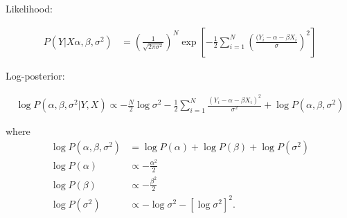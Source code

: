 Likelihood:

\begin{align*}
    P(Y|X\alpha, \beta, \sigma^2) & =
    \left(
        \frac{1}{\sqrt{2\pi\sigma^2}}
    \right)^N
    \exp
    \left[
        -\frac{1}{2}
        \sum_{i=1}^N
        \left(
            \frac{(Y_i - \alpha - \beta X_i}{\sigma}
        \right)^2
    \right]
\end{align*}

Log-posterior:

\begin{align*}
    \log P(\alpha, \beta, \sigma^2|Y, X) \propto 
    -\frac{N}{2}
    \log \sigma^2
    -
    \frac{1}{2}
    \sum_{i=1}^N
    \frac{(Y_i - \alpha - \beta X_i)^2}{\sigma^2}
    +
    \log P(\alpha, \beta, \sigma^2)
\end{align*}

where
\begin{align*}
    \log P(\alpha, \beta, \sigma^2) &= \log P(\alpha) + \log P(\beta) + \log P(\sigma^2) \\
    \log P(\alpha) &\propto - \frac{\alpha^2}{2} \\
    \log P(\beta) & \propto - \frac{\beta^2}{2} \\
    \log P(\sigma^2) &\propto -\log \sigma^2 - [\log \sigma^2]^2.
\end{align*}